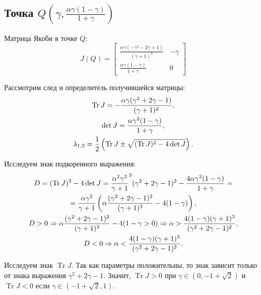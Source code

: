 \documentclass[11pt]{article}
\DeclareMathOperator{\Tr}{Tr}
\begin{document}
\subsection{Точка $Q\left(\gamma, \frac{\alpha\gamma(1 - \gamma)}{1 + \gamma}\right)$}

Матрица Якоби в точке $Q$:
$$
J(Q) = \left[ \begin{array}{ccc}
\frac{\alpha\gamma(-\gamma^2 - 2\gamma + 1)}{(\gamma + 1)^2} & -\gamma \\[0.5em]
\frac{\alpha\gamma(1 - \gamma)}{1 + \gamma} & 0
\end{array} \right]
$$

Рассмотрим след и определитель получившейся матрицы:
\begin{gather}
\Tr J = -\frac{\alpha\gamma(\gamma^2 + 2\gamma - 1)}{(\gamma + 1)^2}, \notag \\
\det J = \frac{\alpha\gamma^2(1 - \gamma)}{1 + \gamma}, \notag \\
\lambda_{1,2} = \frac{1}{2}\left( \Tr J \pm \sqrt{(\Tr J)^2 - 4 \det J} \right). \notag
\end{gather}

Исследуем знак подкоренного выражения:
\begin{gather}
D = (\Tr J)^2 - 4 \det J = \frac{\alpha^2\gamma^2}{\gamma + 1}^3(\gamma^2 + 2\gamma - 1)^2 - \frac{4\alpha\gamma^2(1 - \gamma)}{1 + \gamma} = \notag \\
= \frac{\alpha\gamma^2}{\gamma + 1}\left( \alpha\frac{(\gamma^2 + 2\gamma - 1)^2}{(\gamma + 1)^3} - 4(1 - \gamma) \right), \notag \\
D > 0 \Rightarrow \alpha\frac{(\gamma^2 + 2\gamma - 1)^2}{(\gamma + 1)^3} - 4(1 - \gamma > 0) \Rightarrow \alpha > \frac{4(1 - \gamma)(\gamma + 1)^3}{(\gamma^2 + 2\gamma - 1)^2}, \notag \\
D < 0 \Rightarrow \alpha < \frac{4(1 - \gamma)(\gamma + 1)^3}{(\gamma^2 + 2\gamma - 1)^2}. \notag
\end{gather}

Исследуем знак $\Tr J$. Так как параметры положительны, то знак зависит только от знака выражения $\gamma^2 + 2\gamma - 1$. Значит, $\Tr J > 0$ при $\gamma \in (0, -1 + \sqrt{2})$ и $\Tr J < 0$ если $\gamma \in (-1 + \sqrt{2}, 1)$.
\end{document}
